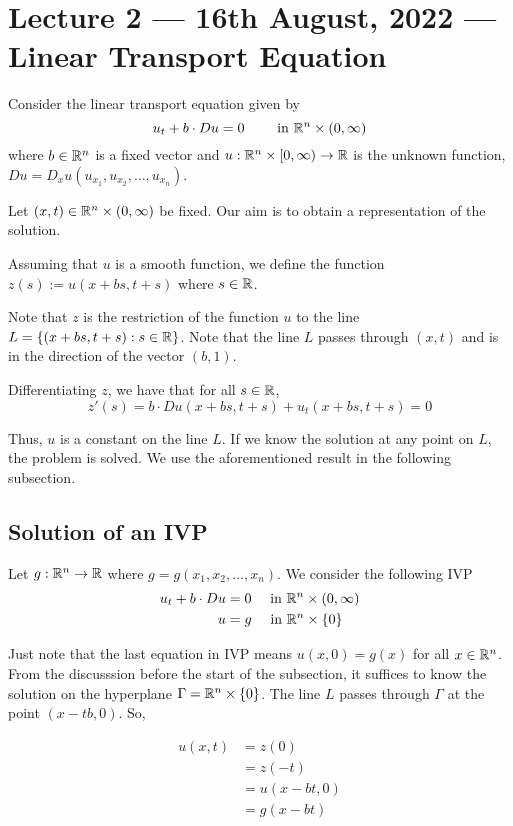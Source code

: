 \section{Lecture 2 --- 16th August, 2022 --- Linear Transport Equation}

Consider the linear transport equation given by 
$$u_t + b\cdot Du = 0 \qquad \text{ in } \mathbb R ^n \times (0, \infty)$$
where $b\in \mathbb R ^n$ is a fixed vector and $u: \mathbb R ^n \times [0, \infty ) \to \mathbb R$ is the unknown function, $Du = D_x u (u_{x_1}, u_{x_2} , \ldots , u_{x_n})$. 

Let $(x,t) \in \mathbb R ^n \times (0, \infty)$ be fixed. Our aim is to obtain a representation of the solution.

Assuming that $u$ is a smooth function, we define the function $z(s):= u(x+bs,t+s)$ where $s\in \mathbb R$.

Note that $z$ is the restriction of the function $u$ to the line $L=\left\{ \left( x+bs, t+s  \right) : s \in \mathbb R \right\}$. Note that the line $L$ passes through $(x,t)$ and is in the direction of the vector $(b,1)$.

Differentiating $z$, we have that for all $s\in \mathbb R$, 
\begin{equation*}
    z'(s)=b\cdot Du (x+bs , t+s) + u_t (x+bs, t+s) = 0 
\end{equation*}

Thus, $u$ is a constant on the line $L$. If we know the solution at any point on $L$, the problem is solved. We use the aforementioned result in the following subsection.

\subsection{Solution of an IVP}

Let $g: \mathbb R ^n \to \mathbb R$ where $g=g(x_1, x_2 ,\ldots , x_n)$. We consider the following IVP
\begin{align*}
    u_t + b\cdot Du &= 0 \quad \text{ in } \mathbb R ^n \times (0,\infty ) \\
    u &= g \quad \text{ in } \mathbb R^n \times \left\{ 0 \right\}
\end{align*}

Just note that the last equation in IVP means $u(x,0) = g(x)$ for all $x\in \mathbb R ^n$. From the discusssion before the start of the subsection, it suffices to know the solution on the hyperplane $\Gamma = \mathbb R ^n \times \left\{ 0 \right\}$. The line $L$ passes through $\Gamma$ at the point $(x-tb, 0 )$. So,

\begin{align*}
    u(x,t)&= z(0) \\
    &= z(-t) \\
&= u(x-bt, 0) \\
&= g(x-bt)
\end{align*}

